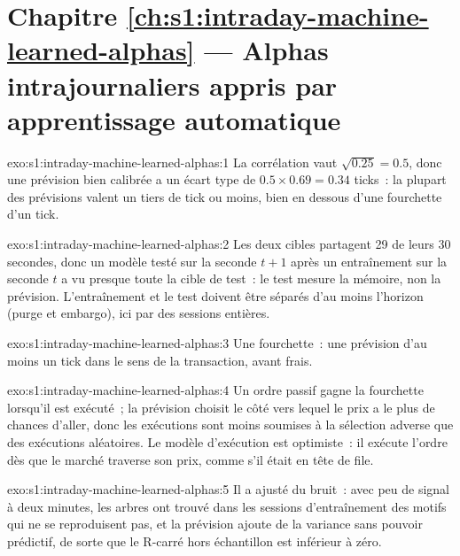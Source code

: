 \section*{Chapitre \ref{ch:s1:intraday-machine-learned-alphas} --- Alphas intrajournaliers appris par apprentissage automatique}

\begin{solution}{exo:s1:intraday-machine-learned-alphas:1}
La corrélation vaut $\sqrt{0.25} = 0.5$, donc une prévision bien calibrée a un écart type de $0.5 \times 0.69 = 0.34$ ticks~: la plupart des prévisions valent un tiers de
tick ou moins, bien en dessous d'une fourchette d'un tick.
\end{solution}

\begin{solution}{exo:s1:intraday-machine-learned-alphas:2}
Les deux cibles partagent 29 de leurs 30 secondes, donc un modèle testé sur la seconde $t + 1$ après un entraînement sur la seconde $t$ a vu presque toute la cible de test~: le
test mesure la mémoire, non la prévision. L'entraînement et le test doivent être séparés d'au moins l'horizon (purge et embargo), ici par des sessions entières.
\end{solution}

\begin{solution}{exo:s1:intraday-machine-learned-alphas:3}
Une fourchette~: une prévision d'au moins un tick dans le sens de la transaction, avant frais.
\end{solution}

\begin{solution}{exo:s1:intraday-machine-learned-alphas:4}
Un ordre passif gagne la fourchette lorsqu'il est exécuté~; la prévision choisit le côté vers lequel le prix a le plus de chances d'aller, donc les exécutions sont moins soumises à la sélection adverse
que des exécutions aléatoires. Le modèle d'exécution est optimiste~: il exécute l'ordre dès que le marché traverse son prix, comme s'il était en tête de
file.
\end{solution}

\begin{solution}{exo:s1:intraday-machine-learned-alphas:5}
Il a ajusté du bruit~: avec peu de signal à deux minutes, les arbres ont trouvé dans les sessions d'entraînement des motifs qui ne se reproduisent pas, et la prévision ajoute
de la variance sans pouvoir prédictif, de sorte que le R-carré hors échantillon est inférieur à zéro.
\end{solution}

